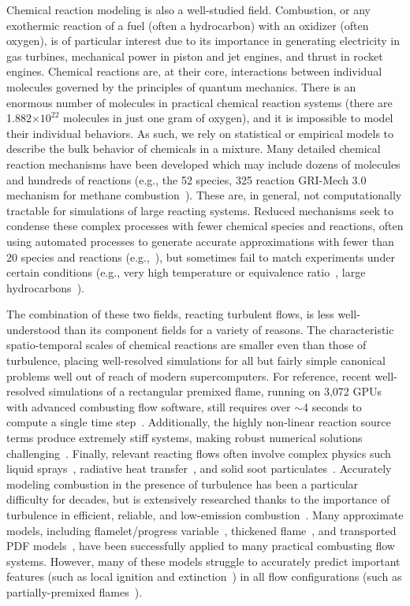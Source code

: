 Chemical reaction modeling is also a well-studied field. Combustion, or any exothermic reaction of a fuel (often a hydrocarbon) with an oxidizer (often oxygen), is of particular interest due to its importance in generating electricity in gas turbines, mechanical power in piston and jet engines, and thrust in rocket engines. Chemical reactions are, at their core, interactions between individual molecules governed by the principles of quantum mechanics. There is an enormous number of molecules in practical chemical reaction systems (there are 1.882$\times 10^{22}$ molecules in just one gram of oxygen), and it is impossible to model their individual behaviors. As such, we rely on statistical or empirical models to describe the bulk behavior of chemicals in a mixture. Many detailed chemical reaction mechanisms have been developed which may include dozens of molecules and hundreds of reactions (e.g., the 52 species, 325 reaction GRI-Mech 3.0 mechanism for methane combustion~\cite{griMech}). These are, in general, not computationally tractable for simulations of large reacting systems. Reduced mechanisms seek to condense these complex processes with fewer chemical species and reactions, often using automated processes to generate accurate approximations with fewer than 20 species and reactions (e.g.,~\cite{Sung1998}), but sometimes fail to match experiments under certain conditions (e.g., very high temperature or equivalence ratio~\cite{Westbrook1984}, large hydrocarbons~\cite{Lu2008}).

The combination of these two fields, reacting turbulent flows, is less well-understood than its component fields for a variety of reasons. The characteristic spatio-temporal scales of chemical reactions are smaller even than those of turbulence, placing well-resolved simulations for all but fairly simple canonical problems well out of reach of modern supercomputers. For reference, recent well-resolved simulations of a rectangular premixed flame, running on 3,072 GPUs with advanced combusting flow software, still requires over $\sim$4 seconds to compute a single time step~\cite{HenrydeFrahan2022}. Additionally, the highly non-linear reaction source terms produce extremely stiff systems, making robust numerical solutions challenging~\cite{SuoYang2017}. Finally, relevant reacting flows often involve complex physics such liquid sprays~\cite{Masri2016}, radiative heat transfer~\cite{radCombustion}, and solid soot particulates~\cite{Omidvarborna2015}. Accurately modeling combustion in the presence of turbulence has been a particular difficulty for decades, but is extensively researched thanks to the importance of turbulence in efficient, reliable, and low-emission combustion~\cite{peters2000}. Many approximate models, including flamelet/progress variable~\cite{Pierce2001}, thickened flame~\cite{Colin2000}, and transported PDF models~\cite{Pope1985}, have been successfully applied to many practical combusting flow systems. However, many of these models struggle to accurately predict important features (such as local ignition and extinction~\cite{Jones2007}) in all flow configurations (such as partially-premixed flames~\cite{Knudsen2015}).

